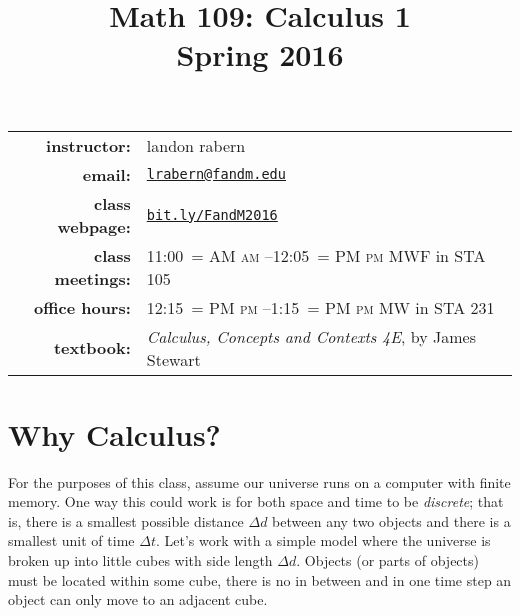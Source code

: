 \documentclass[12pt]{article}
\title{Math 109: Calculus 1\\ \bigskip\small{Spring 2016}}
\date{}
\makeatletter
\DeclareRobustCommand{\maybefakesc}[1]{%
  \ifnum\pdfstrcmp{\f@series}{\bfdefault}=\z@
    {\fontsize{\dimexpr0.8\dimexpr\f@size pt\relax}{0}\selectfont\uppercase{#1}}%
  \else
    \textsc{#1}%
  \fi
}
\newcommand\AM{\,\maybefakesc{am}\xspace}
\newcommand\PM{\,\maybefakesc{pm}\xspace}
\makeatother
\begin{document}
\maketitle

\begin{tabular}{r l}
\textbf{instructor:}& landon rabern\\
\textbf{email:}& \href{mailto:lrabern@fandm.edu}{\nolinkurl{lrabern@fandm.edu}}\\
\textbf{class webpage:}& \href{http://bit.ly/FandM2016}{\nolinkurl{bit.ly/FandM2016}}\\
\textbf{class meetings:}& 11:00\AM--12:05\PM MWF in STA 105 \\
\textbf{office hours:}& 12:15\PM--1:15\PM MW in STA 231\\
\textbf{textbook:}&\textit{Calculus, Concepts and Contexts 4E}, by James Stewart\\
\end{tabular}

\bigskip

\section*{Why Calculus?}
For the purposes of this class, assume our universe runs on a computer with finite memory.  One way this could work is for both space and time to be \emph{discrete}; that is, there is a smallest possible distance $\Delta d$ between any two objects and there is a smallest unit of time $\Delta t$.  Let's work with a simple model where the universe is broken up into little cubes with side length $\Delta d$.  Objects (or parts of objects) must be located within some cube, there is no in between and in one time step an object can only move to an adjacent cube.  
\end{document}
